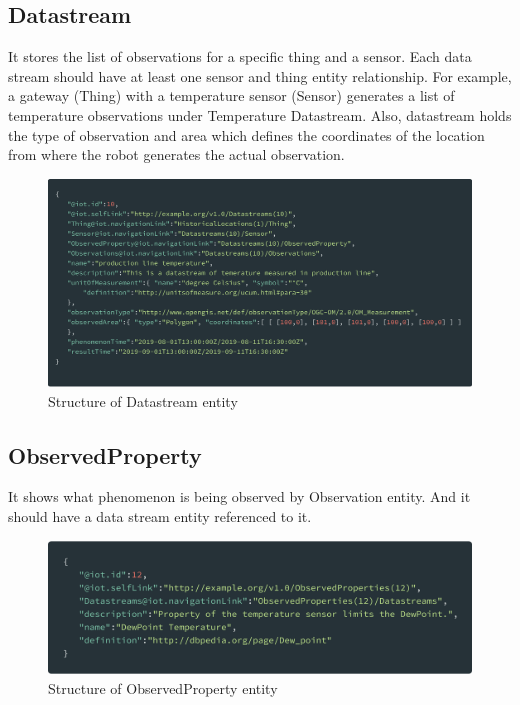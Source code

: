 	\subsection{Datastream}
	 It stores the list of observations for a specific thing and a sensor. Each data stream should have at least one sensor and thing entity relationship. For example, a gateway (Thing) with a temperature sensor (Sensor) generates a list of temperature observations under Temperature Datastream.  Also, datastream holds the type of observation and area which defines the coordinates of the location from where the robot generates the actual observation.
	
	\begin{figure}[!htbp] 
		\begin{center}
			\includegraphics[scale=0.1]{./images/png/ogc/datastream}	
			\caption{Structure of Datastream entity}	
			\label{fig:datastream}	
		\end{center}
	\end{figure}


	\subsection{ObservedProperty}
	It shows what phenomenon is being observed by Observation entity. And it should have a data stream entity referenced to it.
	
	\begin{figure}[!htbp] 
		\begin{center}
			\includegraphics[scale=0.1]{./images/png/ogc/observedproperty}	
			\caption{Structure of ObservedProperty entity}	
			\label{fig:observedproperty}	
		\end{center}
	\end{figure}

